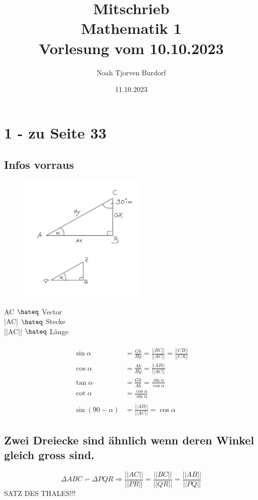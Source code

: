 \documentclass[a4paper,onecolumn,pdftex]{report}
\begin{document}
    \author{Noah Tjorven Burdorf}
    \title{Mitschrieb \\ Mathematik 1 \\ Vorlesung vom 10.10.2023}
    \date{11.10.2023}
    \maketitle

    \section*{1 - zu Seite 33}
    \subsection*{Infos vorraus}
    \begin{figure}
        \includegraphics[width=6cm]{2023-10-10_22h01_07.png}
    \end{figure}
    AC $\hateq$ Vector \\
    |AC| $\hateq$ Stecke \\
    ||AC|| $\hateq$ L\"ange \\\\
    \begin{align*}
        \sin\alpha&=\frac{Gk}{Hy}=\frac{||BC||}{||AC||}=\frac{||CB||}{||CA||} \\
        \cos\alpha&=\frac{Ak}{Hy}=\frac{||AB||}{||AC||} \\
        \tan\alpha&=\frac{Gk}{Ak}=\frac{\sin\alpha}{\cos\alpha} \\
        \cot\alpha&=\frac{\cos\alpha}{\sin\alpha} \\\\
        \sin(90-\alpha) &= \frac{||AB||}{||AC||} = \cos\alpha
    \end{align*}
    \subsection*{Zwei Dreiecke sind \"ahnlich wenn deren Winkel gleich gross sind.}
    $$\Delta ABC \backsim \Delta PQR \Rightarrow \frac{||AC||}{||PR||}=\frac{||BC||}{||QR||}=\frac{||AB||}{||PQ||}$$
    SATZ DES THALES!!!
\end{document}
